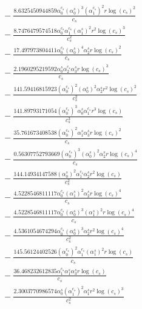 \documentclass[10pt]{article}
\begin{document}
\begin{align*}
&{}  - \frac{8.6325450944859 \alpha_{0}^{c_s} \left(\alpha_{0}^s\right)^{3} \left(\alpha_{1}^{c_s}\right)^{2} r \log{\left(c_{s} \right)}^{2}}{c_{s}} \\
&{}  - \frac{8.7476479574518 \alpha_{0}^{c_s} \alpha_{1}^{c_s} \left(\alpha_{1}^s\right)^{2} r^{2} \log{\left(c_{s} \right)}^{3}}{c_{s}^{2}} \\
&{}  - \frac{17.497973804411 \alpha_{0}^{c_s} \left(\alpha_{0}^s\right)^{4} \alpha_{2}^s r \log{\left(c_{s} \right)}^{2}}{c_{s}} \\
&{}  - \frac{2.1960295219592 \alpha_{0}^s \alpha_{2}^{c_s} \alpha_{3}^s r \log{\left(c_{s} \right)}^{3}}{c_{s}} \\
&{}  - \frac{141.59416815923 \left(\alpha_{0}^{c_s}\right)^{2} \left(\alpha_{0}^s\right)^{2} \alpha_{2}^s r^{2} \log{\left(c_{s} \right)}^{2}}{c_{s}^{2}} \\
&{}  - \frac{141.89793171054 \left(\alpha_{0}^{c_s}\right)^{3} \alpha_{0}^s \alpha_{1}^{c_s} r^{3} \log{\left(c_{s} \right)}}{c_{s}^{3}} \\
&{}  - \frac{35.761673408538 \left(\alpha_{0}^{c_s}\right)^{2} \alpha_{1}^s \alpha_{3}^s r \log{\left(c_{s} \right)}^{2}}{c_{s}} \\
&{}  - \frac{0.56307752793669 \left(\alpha_{0}^{c_s}\right)^{3} \left(\alpha_{0}^s\right)^{2} \alpha_{2}^s r \log{\left(c_{s} \right)}^{4}}{c_{s}} \\
&{}  - \frac{144.14934147588 \left(\alpha_{0}^s\right)^{2} \alpha_{1}^{c_s} \alpha_{2}^s r^{2} \log{\left(c_{s} \right)}}{c_{s}^{2}} \\
&{}  - \frac{4.5228546811117 \alpha_{0}^{c_s} \left(\alpha_{1}^s\right)^{2} \alpha_{2}^s r \log{\left(c_{s} \right)}^{4}}{c_{s}} \\
&{}  - \frac{4.5228546811117 \alpha_{0}^{c_s} \left(\alpha_{0}^s\right)^{3} \left(\alpha_{1}^s\right)^{2} r \log{\left(c_{s} \right)}^{4}}{c_{s}} \\
&{}  - \frac{4.5361054674294 \alpha_{0}^{c_s} \left(\alpha_{0}^s\right)^{3} \alpha_{2}^s r^{2} \log{\left(c_{s} \right)}^{4}}{c_{s}^{2}} \\
&{}  - \frac{145.56124402526 \left(\alpha_{0}^{c_s}\right)^{2} \alpha_{1}^{c_s} \left(\alpha_{1}^s\right)^{2} r \log{\left(c_{s} \right)}}{c_{s}} \\
&{}  - \frac{36.468232612835 \alpha_{1}^{c_s} \alpha_{1}^s \alpha_{3}^s r \log{\left(c_{s} \right)}}{c_{s}} \\
&{}  - \frac{2.3003770986574 \alpha_{0}^s \left(\alpha_{1}^{c_s}\right)^{2} \alpha_{1}^s r^{2} \log{\left(c_{s} \right)}^{3}}{c_{s}^{2}} \\

\end{align*}
\end{document}
